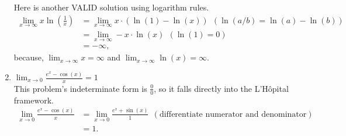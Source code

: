 \begin{enumerate}
Here is another VALID solution using logarithm rules.
\begin{align*}
     \lim_{{x \to \infty}} x \ln\left(\frac{1}{x}\right) & =  \lim_{{x \to \infty}} x \cdot \left( \ln(1) - \ln(x) \right) ~~ (\ln(a/b) = \ln(a) - \ln(b))\\
     &= \lim_{{x \to \infty}} -x \cdot \ln(x)~~(\ln(1) = 0) \\
     & = -\infty,
\end{align*}
because, $\displaystyle \lim_{{x \to \infty}} x = \infty$ and $\displaystyle \lim_{{x \to \infty}} \ln(x) = \infty$.

\item \Ans $\displaystyle \lim_{{x \to 0}} \frac{e^x - \cos(x)}{x} = 1$\\

This problem's indeterminate form is $\frac{0}{0}$, so it falls directly into the L'H\^opital framework.
\begin{align*}
      \lim_{{x \to 0}} \frac{e^x - \cos(x)}{x} &=   \lim_{{x \to 0}} \frac{e^x + \sin(x)}{1}~~ (\text{differentiate numerator and denominator})\\
     &=  1.
\end{align*}
\end{enumerate}    

\Qed




